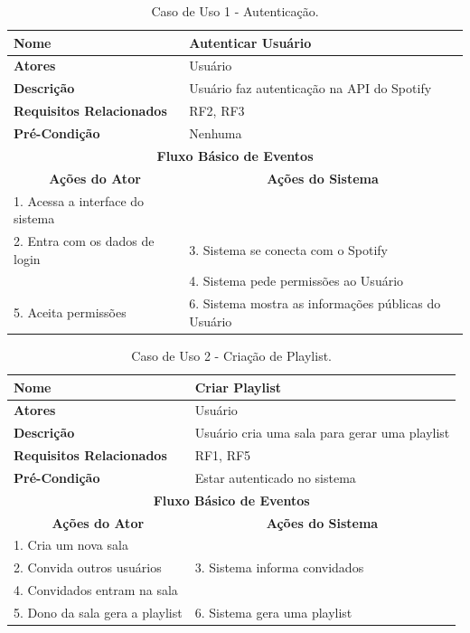 \documentclass[
	12pt,				%
    oneside,			%
	a4paper,			%
	english,			%
	french,				%
	spanish,			%
	brazil,				%
	]{abntex2}
\begin{document}
\begin{table}[h]
\centering
\label{tableUC1}
\begin{tabular}{|l|l|}
\hline
\textbf{Nome}                    & Autenticar Usuário   \\ \hline
\textbf{Atores}                  & Usuário                   \\ \hline
\textbf{Descrição}               & Usuário faz autenticação na API do Spotify \\ \hline
\textbf{Requisitos Relacionados} & RF2, RF3                  \\ \hline
\textbf{Pré-Condição}            & Nenhuma                   \\ \hline
\multicolumn{2}{|c|}{\textbf{Fluxo Básico de Eventos}}       \\ \hline
\multicolumn{1}{|c|}{\textbf{Ações do Ator}}&\multicolumn{1}{|c|}{\textbf{Ações do Sistema}} \\ \hline
1. Acessa a interface do sistema                   &                        \\ \hline
2. Entra com os dados de login & 3. Sistema se conecta com o Spotify \\ \hline
& 4. Sistema pede permissões ao Usuário \\ \hline
5. Aceita permissões & 6. Sistema mostra as informações públicas do Usuário \\ \hline
\end{tabular}
\caption{Caso de Uso 1 - Autenticação.}
\end{table}


\begin{table}[h]
\centering
\label{tableUC2}
\begin{tabular}{|l|l|}
\hline
\textbf{Nome}                    & Criar Playlist   \\ \hline
\textbf{Atores}                  & Usuário                   \\ \hline
\textbf{Descrição}               & Usuário cria uma sala para gerar uma playlist \\ \hline
\textbf{Requisitos Relacionados} & RF1, RF5                  \\ \hline
\textbf{Pré-Condição}            & Estar autenticado no sistema                   \\ \hline
\multicolumn{2}{|c|}{\textbf{Fluxo Básico de Eventos}}       \\ \hline
\multicolumn{1}{|c|}{\textbf{Ações do Ator}}&\multicolumn{1}{|c|}{\textbf{Ações do Sistema}} \\ \hline
1. Cria um nova sala &  \\ \hline
2. Convida outros usuários & 3. Sistema informa convidados \\ \hline
4. Convidados entram na sala & \\ \hline
5. Dono da sala gera a playlist & 6. Sistema gera uma playlist \\ \hline
\end{tabular}
\caption{Caso de Uso 2 - Criação de Playlist.}
\end{table}
\end{document}
